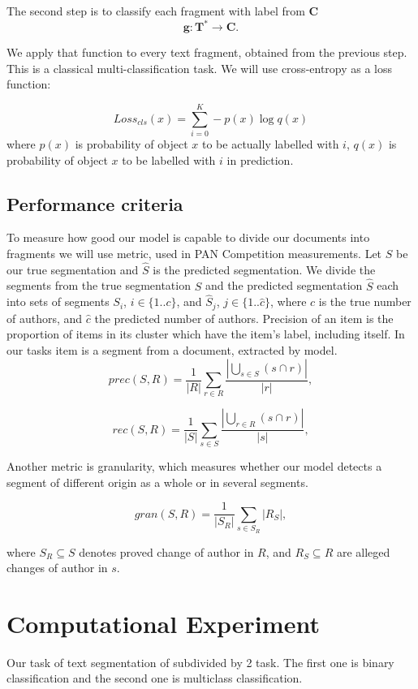 \documentclass{article}
\begin{document}
The second step is to classify each fragment with label from $\mathbf{C}$
$$\mathbf{g}: \mathbf{T}^* \rightarrow \mathbf{C}.$$

We apply that function to every text fragment, obtained from the previous step. This is a classical multi-classification task. We will use cross-entropy as a loss function:

$$Loss_{cls}(x) = \sum_{i=0}^K-p(x)\log q(x)$$ 
where $p(x)$ is probability of object $x$ to be actually labelled with $i$,
$q(x)$ is  probability of object $x$ to be labelled with $i$  in prediction.

\subsection{Performance criteria}

To measure how good our model is capable to divide our documents into fragments we will use metric, used in PAN Competition\cite{granularity} measurements.
Let $S$ be our true segmentation and $\hat{S}$  is the predicted segmentation. We divide the segments from the true segmentation $S$ and the predicted segmentation $\hat{S}$ each into sets of segments $S_i$, $i\in\{1..c\}$, and $\hat{S}_j$, $j\in\{1..\hat{c}\}$, where $c$ is the true number of authors, and $\hat{c}$ the predicted number of authors.  Precision of an item is the proportion of items in its cluster which have the item’s label, including itself. In our tasks item is a segment from a document, extracted by model.  
$$ prec(S, R) = \frac{1}{|R|}\sum_{r \in R}\frac{|\bigcup_{s \in S}(s \cap r)|}{|r|},$$

$$ rec(S, R) = \frac{1}{|S|}\sum_{s \in S}\frac{|\bigcup_{r \in R}(s \cap r)|}{|s|},$$


Another metric is granularity, which measures whether our model detects a segment of different origin as a whole or in several segments.

$$ gran(S, R) = \frac{1}{|S_{R}|}\sum_{s \in S_{R}}|R_{S}|,$$

where $S_{R} \subseteq S$ denotes proved change of author in $R$, and $R_{S} \subseteq R$ are alleged changes of author in $s$.

\section{Computational Experiment}


Our task of text segmentation of subdivided by 2 task. The first one is binary classification and the second one is multiclass classification.
\end{document}
